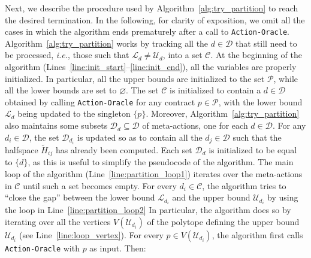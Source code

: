 Next, we describe the procedure used by Algorithm~\ref{alg:try_partition} to reach the desired termination.
%
In the following, for clarity of exposition, we omit all the cases in which the algorithm ends prematurely after a call to \texttt{Action-Oracle}.
%
Algorithm~\ref{alg:try_partition} works by tracking all the $d \in \mathcal{D}$ that still need to be processed, \emph{i.e.}, those such that $\mathcal{L}_{d} \neq \mathcal{U}_{d}$, into a set $\mathcal{C}$.
%
At the beginning of the algorithm (Lines~\ref{line:init_start}--\ref{line:init_end}), all the variables are properly initialized.
% 
In particular, all the upper bounds are initialized to the set $\mathcal{P}$, while all the lower bounds are set to $\varnothing$.
%
The set $\mathcal{C}$ is initialized to contain a $d \in \mathcal{D}$ obtained by calling \texttt{Action-Oracle} for any contract $p \in \mathcal{P}$, with the lower bound $\mathcal{L}_{d}$ being updated to the singleton $\{ p \}$.
%
Moreover, Algorithm~\ref{alg:try_partition} also maintains some subsets $\mathcal{D}_d \subseteq \mathcal{D}$ of meta-actions, one for each $d \in \mathcal{D}$.  
%
For any $d_i \in \mathcal{D}$, the set $\mathcal{D}_{d_i}$ is updated so as to contain all the $d_j \in \mathcal{D}$ such that the halfspace $\widetilde{H}_{i j}$ has already been computed.
%
Each set $\mathcal{D}_d$ is initialized to be equal to $\{ d \}$, as this is useful to simplify the pseudocode of the algorithm.
% 
The main loop of the algorithm (Line~\ref{line:partition_loop1}) iterates over the meta-actions in $\mathcal{C}$ until such a set becomes empty.
%
For every $d_i \in \mathcal{C}$, the algorithm tries to ``close the gap'' between the lower bound $\mathcal{L}_{d_i}$ and the upper bound $\mathcal{U}_{d_i}$ by using the loop in Line~\ref{line:partition_loop2}
%
In particular, the algorithm does so by iterating over all the vertices $V(\mathcal{U}_{d_i})$ of the polytope defining the upper bound $\mathcal{U}_{d_i}$ (see Line~\ref{line:loop_vertex}).
%
For every $p \in V(\mathcal{U}_{d_i})$, the algorithm first calls \texttt{Action-Oracle} with $p$ as input.
%
Then:

